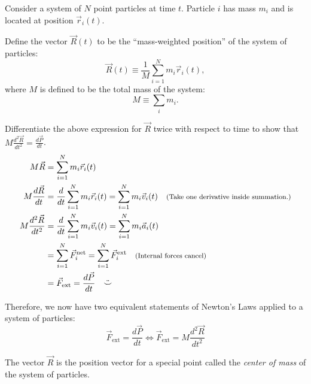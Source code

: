 \documentclass[11pt, letterpaper, openany]{book}
\newenvironment{exercise}[1][Exercise]{%
  \tcolorbox[blanker, breakable, left=1em,
    before skip=1em, after skip=1em,
    borderline west={3pt}{0pt}{PhysNavy},
    colback=PhysCream,
    before upper={\textcolor{PhysNavy}{\sffamily\bfseries #1:}\space}
  ]%
}{%
  \endtcolorbox%
}
\begin{document}
Consider a system of $N$ point particles at time $t$. Particle $i$ has mass $m_i$ and is located at position $\vec{r}_i(t)$.

\begin{center}
\end{center}

Define the vector $\vec{R}(t)$ to be the ``mass-weighted position'' of the system of particles:
\[ \vec{R}(t) \equiv \frac{1}{M}\sum_{i=1}^N m_i\vec{r}_i(t), \tag{3} \]
where $M$ is defined to be the total mass of the system:
\[ M \equiv \sum_i m_i. \]

\begin{exercise}[Exercise 3]
Differentiate the above expression for $\vec{R}$ twice with respect to time to show that $M\frac{d^2\vec{R}}{dt^2} = \frac{d\vec{P}}{dt}$. \\
\textcolor{blue}{
\begin{align*}
    M\vec{R} &= \sum_{i=1}^N m_i\vec{r}_i(t) \\
    M\frac{d\vec{R}}{dt} &= \frac{d}{dt}\sum_{i=1}^N m_i\vec{r}_i(t) = \sum_{i=1}^N m_i\vec{v}_i(t) \quad \text{\footnotesize{(Take one derivative inside summation.)}} \\
    M\frac{d^2\vec{R}}{dt^2} &= \frac{d}{dt}\sum_{i=1}^N m_i\vec{v}_i(t) = \sum_{i=1}^N m_i\vec{a}_i(t) \\
    &= \sum_{i=1}^N \vec{F}_i^{\text{net}} = \sum_{i=1}^N \vec{F}_i^{\text{ext}} \quad \text{\footnotesize{(Internal forces cancel)}} \\
    &= \vec{F}_{\text{ext}} = \frac{d\vec{P}}{dt} \quad \ddot{\smile}
\end{align*}
}
\end{exercise}

Therefore, we now have two equivalent statements of Newton's Laws applied to a system of particles:
\[ \vec{F}_{\text{ext}} = \frac{d\vec{P}}{dt} \iff \vec{F}_{\text{ext}} = M\frac{d^2\vec{R}}{dt^2} \]

The vector $\vec{R}$ is the position vector for a special point called the \textit{center of mass} of the system of particles.
\end{document}

